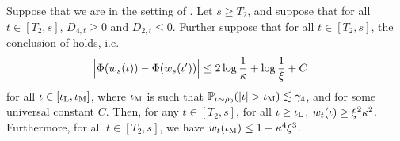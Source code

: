\begin{lemma}  \label{lemma:case_2_neurons_stay_big}
Suppose that we are in the setting of . Let $s \geq T_2$, and suppose that for all $t \in [T_2, s]$, $D_{4, t} \geq 0$ and $D_{2, t} \leq 0$. Further suppose that for all $t \in [T_2, s]$, the conclusion of  holds, i.e.
\begin{align} \label{eq:case2_potential_invariant_IH}
\Big|\Phi(w_s(\iota)) - \Phi(w_s(\iota'))\Big|
& \leq 2 \log \frac{1}{\kappa} + \log \frac{1}{\xi} + C
\end{align}
for all $\iota \in [\iota_{\textup{L}}, \iota_{\textup{M}}]$, where $\iota_{\textup{M}}$ is such that $\mathbb{P}_{\iota \sim \rho_0}(|\iota| > \iota_{\textup{M}}) \lesssim \gamma_4$, and for some universal constant $C$. Then, for any $t \in [T_2, s]$, for all $\iota \geq \iota_{\textup{L}}$, $w_t(\iota) \geq \xi^2 \kappa^2$. Furthermore, for all $t \in [T_2, s]$, we have $w_t(\iota_{\textup{M}}) \leq 1 - \kappa^4 \xi^3$.
\end{lemma}
